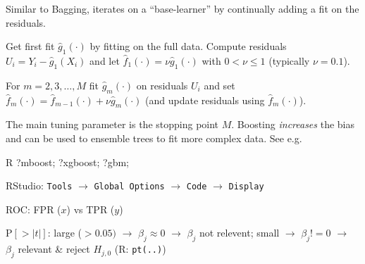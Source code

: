 \begin{sectionbox}[$L_{2}$Boosting]\nospacing{}
  Similar to Bagging, iterates on a ``base-learner'' by continually adding a fit on the residuals.
  \begin{enumeratenosep}[label=\roman*]
    \item Get first fit $\hat{g}_{1}(\cdot)$ by fitting on the full data. Compute residuals $U_{i} = Y_{i} - \hat{g}_{1}(X_{i})$ and let $\hat{f}_{1}(\cdot) = \nu \hat{g}_{1}(\cdot)$ with $0 < \nu \leq 1$ (typically $\nu = 0.1$).
    \item For $m = 2, 3, \dots, M$ fit $\hat{g}_{m}(\cdot)$ on residuals $U_{i}$ and set $\hat{f}_{m}(\cdot) = \hat{f}_{m-1}(\cdot) + \nu \hat{g}_{m}(\cdot)$ (and update residuals using $\hat{f}_{m}(\cdot)$).
  \end{enumeratenosep}
  The main tuning parameter is the stopping point $M$. Boosting \emph{increases} the bias and can be used to ensemble trees to fit more complex data. See e.g.
  \begin{mintlinebox}{R}
    ?mboost; ?xgboost; ?gbm;
  \end{mintlinebox}
\end{sectionbox}
\begin{notebox}[Misc]\nospacing{}
  \begin{enumeratenosep}[label=\roman*]
    \item RStudio: \texttt{Tools} $\rightarrow$ \texttt{Global Options} $\rightarrow$ \texttt{Code} $\rightarrow$ \texttt{Display}
    \item ROC: FPR ($x$) vs TPR ($y$)
    \item $\text{P}[>|t|]$: large ($>0.05)$ $\rightarrow$ $\beta_j \approx 0$ $\rightarrow$ $\beta_j$ not relevent; small $\rightarrow$ $\beta_j!=0$ $\rightarrow$ $\beta_j$ relevant \& reject $H_{j,0}$ (R: \texttt{pt(..)})
  \end{enumeratenosep}
\end{notebox}
